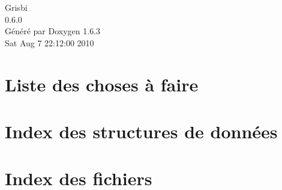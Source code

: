 \documentclass[a4paper]{book}
\begin{document}
\begin{titlepage}
\vspace*{7cm}
\begin{center}
{\Large Grisbi \\[1ex]\large 0.6.0 }\\
\vspace*{1cm}
{\large Généré par Doxygen 1.6.3}\\
\vspace*{0.5cm}
{\small Sat Aug 7 22:12:00 2010}\\
\end{center}
\end{titlepage}
\clearemptydoublepage
{}
\tableofcontents
\clearemptydoublepage
{}
\chapter{Liste des choses à faire}
\label{todo}

\chapter{Index des structures de données}

\chapter{Index des fichiers}

\end{document}
